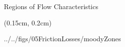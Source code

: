 \documentclass[9pt,xcolor=x11names,professionalfonts, mathserif]{beamer}
\begin{document}
											      												
											      												\begin{frame}{Regions of Flow Characteristics}
											      													\begin{textblock*}{1\columnwidth}(0.15cm, 0.2cm)
											      														\begin{cfig}[0.6]{../../figs/05FrictionLosses/moodyZones}\end{cfig}
											      													\end{textblock*}
											      												\end{frame}
											      												
											      												
											      												
\end{document}
